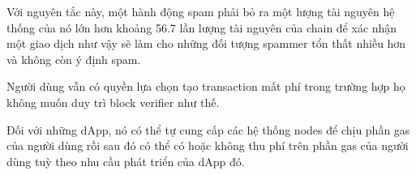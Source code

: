\documentclass[12pt,oneside]{amsart}
\begin{document}
\begin{multicols}{2}
Với nguyên tắc này, một hành động spam phải bỏ ra một lượng tài nguyên hệ thống của nó lớn hơn khoảng 56.7 lần lượng tài nguyên của chain để xác nhận một giao dịch như vậy sẽ làm cho những đối tượng spammer tổn thất nhiều hơn và không còn ý định spam.

Người dùng vẫn có quyền lựa chọn tạo transaction mất phí trong trường hợp họ không muốn duy trì block verifier như thế.

Đối với những dApp, nó có thể tự cung cấp các hệ thống nodes để chịu phần gas của người dùng rồi sau đó có thể có hoặc không thu phí trên phần gas của người dùng tuỳ theo nhu cầu phát triển của dApp đó.





\end{multicols}
\end{document}
